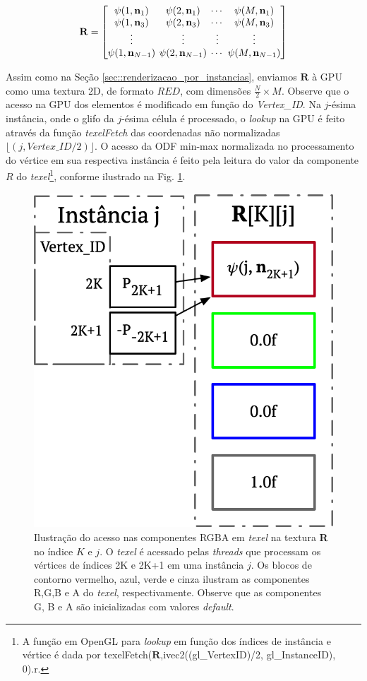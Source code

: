 \documentclass[
    12pt,                %
    oneside,            %
    a4paper,            %
    english,            %
    french,                %
    spanish,            %
    brazil                %
    ]{abntex2}
\begin{document}
\begin{equation}
\label{eq::odf_prototipo3}
\mathbf{R} = 
\begingroup %
\setlength\arraycolsep{2pt}
\begin{bmatrix} 
    \psi(1, \mathbf{n}_1) &
    \psi(2, \mathbf{n}_1) & \cdots & 
    \psi(M, \mathbf{n}_1)  \\
    
    \psi(1, \mathbf{n}_3) &
    \psi(2, \mathbf{n}_3) & \cdots & 
    \psi(M, \mathbf{n}_3) \\ \vdots & \vdots & \vdots & \vdots  \\
    
    \psi(1, \mathbf{n}_{N-1}) & 
    \psi(2, \mathbf{n}_{N-1}) & \cdots & 
    \psi(M, \mathbf{n}_{N-1})
\end{bmatrix}
\endgroup
\end{equation}

Assim como na Seção \ref{sec::renderizacao_por_instancias}, enviamos $\mathbf{R}$ à GPU como uma textura 2D, de formato $RED$, com dimensões $\frac{N}{2}\times M$. Observe que o acesso na GPU dos elementos é modificado em função do \textit{Vertex\_ID}. Na $j$-ésima instância, onde o glifo da $j$-ésima célula é processado, o \textit{lookup} na GPU é feito através da função \textit{texelFetch} das coordenadas não normalizadas $\lfloor (j, Vertex\_ID/2)\rfloor$. O acesso da ODF min-max normalizada no processamento do vértice em sua respectiva instância é feito pela leitura do valor da componente $R$ do \textit{texel}\footnote{A função em OpenGL para \textit{lookup} em função dos índices de instância e vértice é dada por texelFetch($\mathbf{R}$,ivec2((gl\_VertexID)/2, gl\_InstanceID), 0).r.}, conforme ilustrado na Fig. \ref{fig::texelfetch_prototipo3}.

\begin{figure}[htb]
    \centering
    \includegraphics[width=.35\linewidth, angle=0]{figs/Renderizacao_glifos_evolucao/texellookup_RED_2.png}
    \caption{Ilustração do acesso nas componentes RGBA em \textit{texel} na textura \textbf{R} no índice $K$ e $j$. O \textit{texel} é acessado pelas \textit{threads} que processam os vértices de índices 2K e 2K+1 em uma instância $j$. Os blocos de contorno vermelho, azul, verde e cinza ilustram as componentes R,G,B e A do \textit{texel}, respectivamente. Observe que as componentes G, B e A são inicializadas com valores \textit{default}.}
    \label{fig::texelfetch_prototipo3}
\end{figure}
\end{document}
